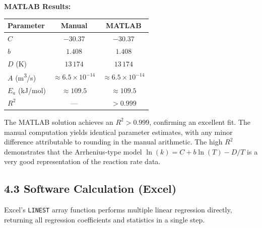 \documentclass[12pt,a4paper]{article}
\begin{document}
\textbf{MATLAB Results:}

\begin{center}
\begin{tabular}{lcc}
  \toprule
  \textbf{Parameter} & \textbf{Manual} & \textbf{MATLAB} \\
  \midrule
  $C$ & $-30.37$ & $-30.37$ \\
  $b$ & $1.408$ & $1.408$ \\
  $D$ (K) & $13\,174$ & $13\,174$ \\
  $A$ (m\textsuperscript{3}/s) & $\approx 6.5\times10^{-14}$ & $\approx 6.5\times10^{-14}$ \\
  $E_a$ (kJ/mol) & $\approx 109.5$ & $\approx 109.5$ \\
  $R^2$ & --- & $> 0.999$ \\
  \bottomrule
\end{tabular}
\end{center}

The MATLAB solution achieves an $R^2 > 0.999$, confirming an excellent fit. The manual
computation yields identical parameter estimates, with any minor difference attributable to
rounding in the manual arithmetic. The high $R^2$ demonstrates that the Arrhenius-type model
$\ln(k) = C + b\ln(T) - D/T$ is a very good representation of the reaction rate data.

\subsection{4.3 Software Calculation (Excel)}

Excel's \texttt{LINEST} array function performs multiple linear regression directly,
returning all regression coefficients and statistics in a single step.
\end{document}
